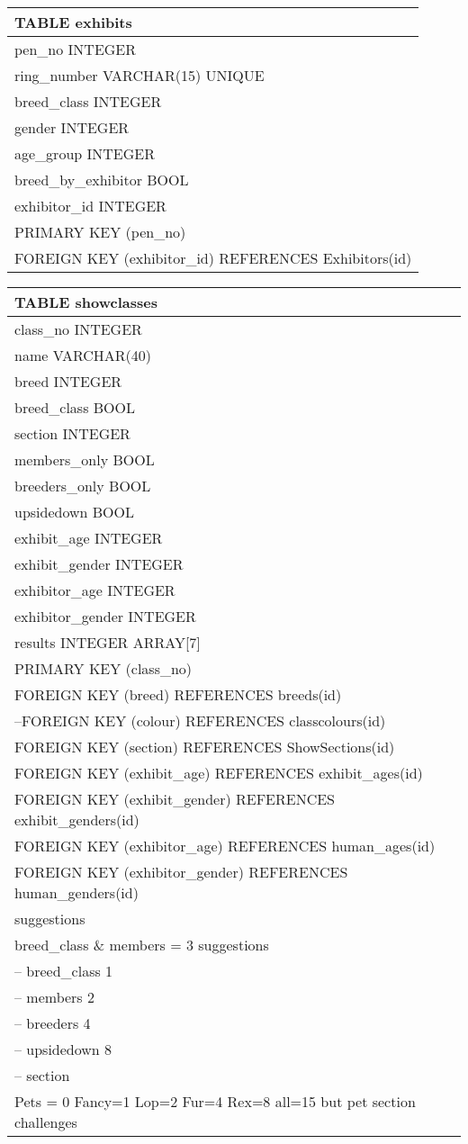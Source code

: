 \documentclass[a4paper,11pt]{report}
\begin{document}
\newline \newline
\begin{tabular}{|p{15cm}|}  \hline
TABLE exhibits\\ \hline
pen\_no INTEGER\\
ring\_number VARCHAR(15) UNIQUE\\  
breed\_class INTEGER\\
gender INTEGER\\
age\_group INTEGER\\
breed\_by\_exhibitor BOOL\\
exhibitor\_id INTEGER\\
PRIMARY KEY (pen\_no)\\
FOREIGN KEY (exhibitor\_id) REFERENCES Exhibitors(id)\\ \hline
\end{tabular}
\newpage
\begin{tabular}{|p{15cm}|}  \hline
TABLE showclasses \\ \hline
class\_no INTEGER\\ 
name VARCHAR(40)\\
breed INTEGER\\
breed\_class BOOL\\ 
section INTEGER\\
members\_only BOOL\\ 
breeders\_only BOOL\\ 
upsidedown BOOL\\
exhibit\_age INTEGER\\
exhibit\_gender INTEGER\\ 
exhibitor\_age INTEGER\\
exhibitor\_gender INTEGER\\ 
results INTEGER ARRAY[7]\\
PRIMARY KEY (class\_no)\\
FOREIGN KEY (breed) REFERENCES breeds(id)\\
--FOREIGN KEY (colour) REFERENCES classcolours(id)\\
FOREIGN KEY (section) REFERENCES ShowSections(id)\\
FOREIGN KEY (exhibit\_age) REFERENCES exhibit\_ages(id)\\
FOREIGN KEY (exhibit\_gender) REFERENCES exhibit\_genders(id)\\
FOREIGN KEY (exhibitor\_age) REFERENCES human\_ages(id)\\
FOREIGN KEY (exhibitor\_gender) REFERENCES human\_genders(id)\\
\hline
suggestions \\
breed\_class \& members = 3 suggestions \\ 
-- breed\_class 1 \\
-- members     2\\
-- breeders    4\\
-- upsidedown  8 \\
-- section\\
Pets = 0 Fancy=1 Lop=2 Fur=4 Rex=8 all=15 but pet section challenges \\ \hline
\end{tabular}
\end{document}
